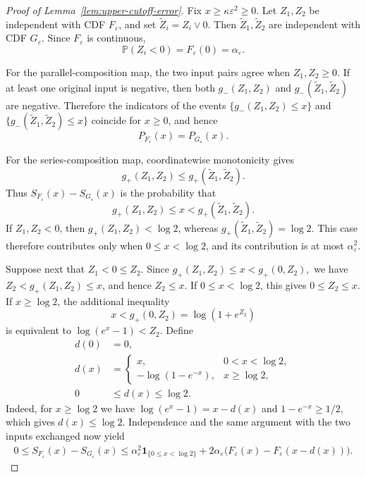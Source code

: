\documentclass[12pt]{amsart}
\numberwithin{equation}{section}
\theoremstyle{plain}
\theoremstyle{definition}
\newcommand{\Pp}{\mathbb P}
\newcommand{\ind}{\mathbf 1}
\begin{document}
\begin{proof}[Proof of Lemma~\ref{lem:upper-cutoff-error}]
Fix $x\ge\kappa\varepsilon^2\ge0$.  Let $Z_1,Z_2$ be
independent with CDF $F_\varepsilon$, and set
$\widetilde Z_i=Z_i\vee0$.  Then $\widetilde Z_1,\widetilde Z_2$ are
independent with CDF $G_\varepsilon$.  Since $F_\varepsilon$ is
continuous,
\[
 \Pp(Z_i<0)=F_\varepsilon(0)=\alpha_\varepsilon.
\]

For the parallel-composition map, the two input pairs agree when $Z_1,Z_2\ge0$.
If at least one original input is negative, then both
$g_-(Z_1,Z_2)$ and
$g_-(\widetilde Z_1,\widetilde Z_2)$ are negative.  Therefore the indicators
of the events $\{g_-(Z_1,Z_2)\le x\}$ and
$\{g_-(\widetilde Z_1,\widetilde Z_2)\le x\}$ coincide for $x\ge0$, and hence
\[
 P_{F_\varepsilon}(x)=P_{G_\varepsilon}(x).
\]

For the series-composition map, coordinatewise monotonicity gives
\[
 g_+(Z_1,Z_2)
 \le g_+(\widetilde Z_1,\widetilde Z_2).
\]
Thus
$S_{F_\varepsilon}(x)-S_{G_\varepsilon}(x)$ is the probability that
\[
 g_+(Z_1,Z_2)\le x
 <g_+(\widetilde Z_1,\widetilde Z_2).
\]
If $Z_1,Z_2<0$, then $g_+(Z_1,Z_2)<\log2$, whereas
$g_+(\widetilde Z_1,\widetilde Z_2)=\log2$.  This case therefore
contributes only when $0\le x<\log2$, and its contribution is at most
$\alpha_\varepsilon^2$.

Suppose next that $Z_1<0\le Z_2$.  Since
$g_+(Z_1,Z_2)\le x<g_+(0,Z_2),$
we have
$Z_2<g_+(Z_1,Z_2)\le x$, and hence $Z_2\le x$.  If
$0\le x<\log2$, this gives
$0\le Z_2\le x$.  If $x\ge\log2$, the additional inequality
\[
 x<g_+(0,Z_2)=\log(1+e^{Z_2})
\]
is equivalent to $\log(e^x-1)<Z_2$.  Define
\begin{equation*}
\begin{aligned}
 d(0)&=0,\\
 d(x)&=
 \begin{cases}
  x,&0<x<\log2,\\
  -\log(1-e^{-x}),&x\ge\log2,
 \end{cases}\\
 0&\le d(x)\le\log2.
\end{aligned}
\end{equation*}
Indeed, for $x\ge\log2$ we have
$\log(e^x-1)=x-d(x)$ and $1-e^{-x}\ge1/2$, which gives
$d(x)\le\log2$.  Independence and the same argument with the two
inputs exchanged now yield
\begin{equation*}
\begin{aligned}
 0\le S_{F_\varepsilon}(x)-S_{G_\varepsilon}(x)
 \le \alpha_\varepsilon^2\ind_{\{0\le x<\log2\}}+2\alpha_\varepsilon
 \bigl(F_\varepsilon(x)-F_\varepsilon(x-d(x))\bigr).
\end{aligned}
\end{equation*}


\end{proof}
\end{document}
